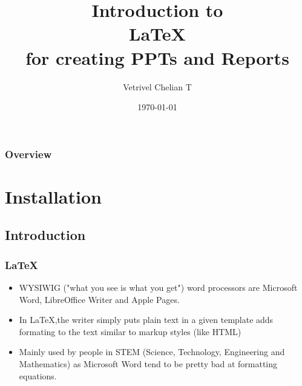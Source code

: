 \documentclass{beamer}
\title[Latex Intro TCE]{Introduction to \\ \LaTeX \\ for creating PPTs and Reports} %
\author{Vetrivel Chelian T} %
\institute[TCE] %
{
Thiagarajar College of Engineering \& Technology, Madurai \\ %
\medskip
\textit{vetrivelchelian@student.tce.edu} %
}
\date{\today} %
\begin{document}
\begin{frame}
\titlepage %
\end{frame}

\begin{frame}
\frametitle{Overview} %
\tableofcontents %
\end{frame}


\section{Installation} %

\subsection{Introduction} %

\begin{frame}
\frametitle{\LaTeX}
\begin{itemize}
\item WYSIWIG ("what you see is what you get") word processors are Microsoft Word, LibreOffice Writer and Apple Pages. 
\item In LaTeX,the writer simply puts plain text in a given template adds formating to the text similar to markup styles (like HTML)
\item Mainly used by people in STEM (Science, Technology, Engineering and Mathematics) as Microsoft Word tend to be pretty bad at formatting equations.
\end{itemize}
\end{frame}
\end{document}
